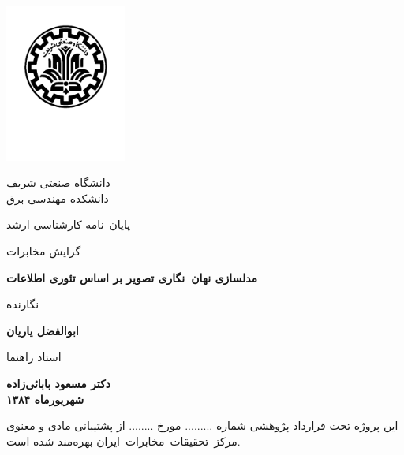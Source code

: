

\thispagestyle{empty}
{\centering
\mainjeldfont
\vspace*{-2.5cm}
\begin{latin}
\centering
\includegraphics[width=4cm]{Sharif_Logo.pdf}
\end{latin}

\vspace*{-2cm}

{\Large دانشگاه صنعتی شریف \\ \vspace{0mm} \large دانشکده مهندسی برق}

\vspace{1.4cm}

{\large پایان~نامه کارشناسی ارشد\par} 
{\large  گرایش مخابرات\par}  
\vspace{1.3cm}
{\Huge \textbf{مدلسازی نهان~نگاری تصویر بر اساس تئوری اطلاعات} }\par

\vfil
{\fieldnamefont نگارنده} \par
{\Large\textbf{ابوالفضل یاریان}}

\vfil
{\fieldnamefont استاد راهنما} \par 
{\Large\textbf{دکتر مسعود بابائی‌زاده}}\\



\vfil
{\textbf{شهریورماه ۱۳۸۴}}


{\ITRCthanksfont این پروژه تحت قرارداد پژوهشی شماره ......... مورخ  ........ از پشتیبانی مادی و معنوی مرکز~تحقیقات~مخابرات~ایران بهره‌مند شده است.}

}